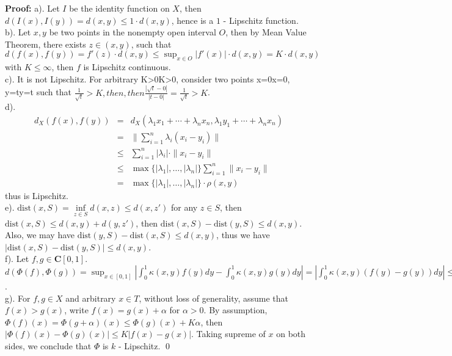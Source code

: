 \documentclass[12pt]{article}
\begin{document}
\textbf{Proof:} a). Let $I$ be the identity function on $X$, then $d(I(x), I(y))=d(x,y)\leq 1\cdot d(x,y)$, hence is a $1$ - Lipschitz function.  \\
\indent b). Let $x, y$ be two points in the nonempty open interval $O$, then by Mean Value Theorem, there exists $z\in (x, y)$, such that $d(f(x), f(y))=f'(z)\cdot d(x, y)\leq \sup_{x\in O}|f'(x)| \cdot d(x, y)=K \cdot d(x, y)$ with $K\leq \infty$, then $f$ is Lipschitz continuous.  \\
\indent c). It is not Lipschitz. For arbitrary K>0K>0, consider two points x=0x=0, y=ty=t such that $\frac{1}{\sqrt{t}}>K,then, then \frac{|\sqrt{t}-0|}{|t-0|}=\frac{1}{\sqrt{t}}>K$.  \\
\indent d).
\begin{eqnarray*}
d_{X}(f(x),f(y))&=&d_{X}(\lambda_{1}x_{1}+\cdots+\lambda_{n}x_{n},\lambda_{1}y_{1}+\cdots+\lambda_{n}x_{n}) \\
&=&\|\sum\limits_{i=1}^{n}\lambda_{i}(x_{i}-y_{i})\| \\
&\leq& \sum\limits_{i=1}^{n}|\lambda_{i}|\cdot \|x_{i}-y_{i}\| \\
&\leq& \max\{|\lambda_{1}|, \dots, |\lambda_{n}|\}\sum\limits_{i=1}^{n}\|x_{i}-y_{i}\| \\
&=& \max\{|\lambda_{1}|, \dots, |\lambda_{n}|\}\cdot\rho(x,y)
\end{eqnarray*} thus is Lipschitz. \\
\indent e). $\text{dist}(x, S)=\inf\limits_{z\in S}d(x, z)\leq d(x, z')$ for any $z\in S$, then $\text{dist}(x, S)\leq d(x, y)+d(y, z')$, then $\text{dist}(x, S)-\text{dist}(y, S)\leq d(x, y)$. Also, we may have $\text{dist}(y, S)-\text{dist}(x, S)\leq d(x,y)$, thus we have $|\text{dist}(x, S)-\text{dist}(y,S)|\leq d(x, y)$. \\
\indent f). Let $f, g\in \mathbf{C}[0, 1]$. $d(\Phi(f), \Phi(g))=\sup_{x\in [0, 1]}\left|\int_{0}^{1}\kappa(x, y)f(y)dy-\int_{0}^{1}\kappa(x,y)g(y)dy\right|=\left|\int_{0}^{1}\kappa(x,y)\left(f(y)-g(y)\right)dy\right|\leq \|\kappa\|_{\infty}\int_{0}^{1}\left|f(y)-g(y)\right|dy\leq \|\kappa\|_{\infty}\sup_{y\in[0, 1]}\left|f(y)-g(y)\right|=\|\kappa\|_{\infty}d(f,g)$. \\
\indent g). For $f,g\in X$ and arbitrary $x\in T$, without loss of generality, assume that $f(x)> g(x)$, write $f(x)=g(x)+\alpha$ for $\alpha>0$. By assumption, $\Phi(f)(x)=\Phi(g+\alpha)(x)\leq \Phi(g)(x)+K\alpha$, then $|\Phi(f)(x)-\Phi(g)(x)|\leq K|f(x)-g(x)|$. Taking supreme of $x$ on both sides, we conclude that $\Phi$ is $k$ - Lipschitz. \qed \\
\end{document}
